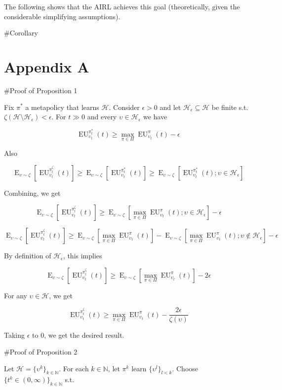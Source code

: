\documentclass[a4paper]{article}
\DeclareMathOperator{\E}{E}
\newcommand{\Nats}{\mathbb{N}}
\newcommand{\Hy}{\mathcal{H}}
\newcommand{\EU}{\operatorname{EU}}
\begin{document}
The following shows that the AIRL achieves this goal (theoretically, given the considerable simplifying assumptions).

\#Corollary



\section{Appendix A}

\#Proof of Proposition 1

Fix $\pi^*$ a metapolicy that learns $\Hy$. Consider $\epsilon > 0$ and let $\Hy_\epsilon \subseteq \Hy$ be finite s.t. $\zeta(\Hy \setminus \Hy_\epsilon) < \epsilon$. For $t \gg 0$ and every $\upsilon \in \Hy_\epsilon$ we have

$$\EU_{\upsilon_t}^{\pi^*_t}(t) \geq \max_{\pi \in \Pi} \EU_{\upsilon_t}^{\pi}(t) - \epsilon$$

Also

$$\E_{\upsilon \sim \zeta}[\EU_{\upsilon_t}^{\pi^\zeta_t}(t)] \geq \E_{\upsilon \sim \zeta}[\EU_{\upsilon_t}^{\pi^*_t}(t)] \geq \E_{\upsilon \sim \zeta}[\EU_{\upsilon_t}^{\pi^*_t}(t); \upsilon \in \Hy_\epsilon]$$

Combining, we get

$$\E_{\upsilon \sim \zeta}[\EU_{\upsilon_t}^{\pi^\zeta_t}(t)] \geq \E_{\upsilon \sim \zeta}[\max_{\pi \in \Pi} \EU_{\upsilon_t}^{\pi}(t); \upsilon \in \Hy_\epsilon] - \epsilon$$

$$\E_{\upsilon \sim \zeta}[\EU_{\upsilon_t}^{\pi^\zeta_t}(t)] \geq \E_{\upsilon \sim \zeta}[\max_{\pi \in \Pi} \EU_{\upsilon_t}^{\pi}(t)] -  \E_{\upsilon \sim \zeta}[\max_{\pi \in \Pi} \EU_{\upsilon_t}^{\pi}(t); \upsilon \not\in \Hy_\epsilon] - \epsilon$$

By definition of $\Hy_\epsilon$, this implies

$$\E_{\upsilon \sim \zeta}[\EU_{\upsilon_t}^{\pi^\zeta_t}(t)] \geq \E_{\upsilon \sim \zeta}[\max_{\pi \in \Pi} \EU_{\upsilon_t}^{\pi}(t)] -  2\epsilon$$

For any $\upsilon \in \Hy$, we get

$$\EU_{\upsilon_t}^{\pi^\zeta_t}(t) \geq \max_{\pi \in \Pi} \EU_{\upsilon_t}^{\pi}(t) - \frac{2\epsilon}{\zeta(\upsilon)}$$

Taking $\epsilon$ to 0, we get the desired result.

\#Proof of Proposition 2

Let $\Hy = \{\upsilon^k\}_{k \in \Nats}$. For each $k \in \Nats$, let $\pi^k$ learn $\{\upsilon^l\}_{l < k}$. Choose $\{t^k \in (0,\infty)\}_{k \in \Nats}$ s.t.
\end{document}
